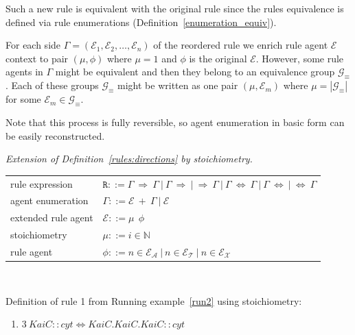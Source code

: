 \documentclass{elsarticle}
\newcommand{\choice}{|}
\begin{document}
Such a new rule is equivalent with the original rule since the rules equivalence is defined via rule enumerations (Definition~\ref{enumeration_equiv}).

For each side $\Gamma = (\mathcal{E}_1, \mathcal{E}_2, \ldots, \mathcal{E}_n)$ of the reordered rule we enrich rule agent $\mathcal{E}$ context to pair $(\mu, \phi)$ where $\mu = 1$ and $\phi$ is the original $\mathcal{E}$. However, some rule agents in $\Gamma$ might be equivalent and then they belong to an equivalence group $\mathcal{G}_\equiv$. Each of these groups $\mathcal{G}_\equiv$ might be written as one pair $(\mu, \mathcal{E}_m)$ where $\mu = |\mathcal{G}_\equiv|$ for some $\mathcal{E}_m \in \mathcal{G}_\equiv$.

Note that this process is fully reversible, so agent enumeration in basic form can be easily reconstructed.

\begin{definition}\label{rules:stoichiometry}
\emph{Extension of Definition~\ref{rules:directions} by stoichiometry.}

\begin{center}
{\small
\hspace*{-1cm}\begin{tabular}{ l l }
 rule expression & $\mathtt{R} ::= \Gamma ~\Rightarrow~ \Gamma ~|~ \Gamma ~\Rightarrow ~|~ \Rightarrow~ \Gamma ~|~ \Gamma ~\Leftrightarrow~ \Gamma ~|~ \Gamma ~\Leftrightarrow ~|~ \Leftrightarrow~ \Gamma $\\
 agent enumeration & $\Gamma ::= \mathcal{E}~ +~\Gamma ~|~ \mathcal{E}$\\
 extended rule agent & $\mathcal{E} ::= \mu ~~ \phi$\\
 stoichiometry & $\mu ::= i \in \mathbb{N}$\\
 rule agent & $\phi ::= n \in \mathcal{E}_\mathcal{A}~\choice~n \in \mathcal{E}_\mathcal{T}~\choice~n \in \mathcal{E}_\mathcal{X}$\\
\end{tabular}
}
\end{center}
\end{definition}

\begin{running_example}\label{run3}
$ $

\noindent Definition of rule 1 from Running example~\ref{run2} using stoichiometry:
\begin{enumerate}
\item $3~KaiC::cyt \Leftrightarrow KaiC.KaiC.KaiC::cyt$
\end{enumerate}
\end{running_example}
\end{document}

